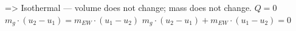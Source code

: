 => Isothermal — volume does not change;  
mass does not change.  
\( Q = 0 \)  
\( m_g \cdot (u_2 - u_1) = m_{EW} \cdot (u_1 - u_2) \)  
\( m_g \cdot (u_2 - u_1) + m_{EW} \cdot (u_1 - u_2) = 0 \)
